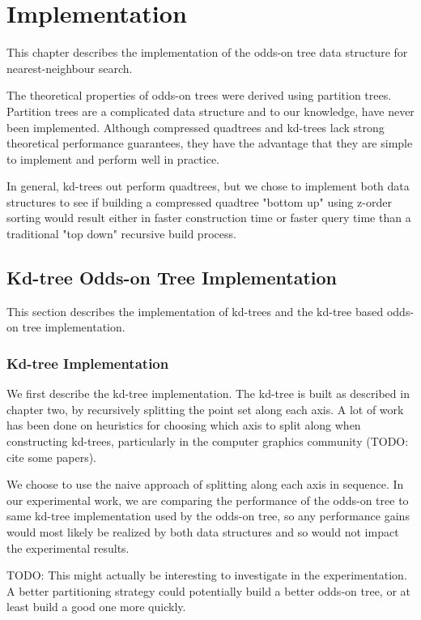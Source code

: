 \documentclass[mcs]{scsthesis}
\begin{document}
\chapter{Implementation}

This chapter describes the implementation of the odds-on tree data structure
for nearest-neighbour search.

The theoretical properties of odds-on trees were derived using partition trees.
Partition trees are a complicated data structure and to our knowledge, have
never been implemented. Although compressed quadtrees and kd-trees lack strong
theoretical performance guarantees, they have the advantage that they are
simple to implement and perform well in practice.

In general, kd-trees out perform quadtrees, but we chose to implement both data
structures to see if building a compressed quadtree "bottom up" using z-order
sorting would result either in faster construction time or faster query time
than a traditional "top down" recursive build process.

\section{Kd-tree Odds-on Tree Implementation}

This section describes the implementation of kd-trees and the kd-tree based
odds-on tree implementation.

\subsection{Kd-tree Implementation}

We first describe the kd-tree implementation. The kd-tree is built as described
in chapter two, by recursively splitting the point set along each axis.  A lot
of work has been done on heuristics for choosing which axis to split along when
constructing kd-trees, particularly in the computer graphics community (TODO:
cite some papers).

We choose to use the naive approach of splitting along each axis in sequence.
In our experimental work, we are comparing the performance of the odds-on tree
to same kd-tree implementation used by the odds-on tree, so any performance
gains would most likely be realized by both data structures and so would not
impact the experimental results.

TODO: This might actually be interesting to investigate in the experimentation.
A better partitioning strategy could potentially build a better odds-on tree,
or at least build a good one more quickly.
\end{document}
